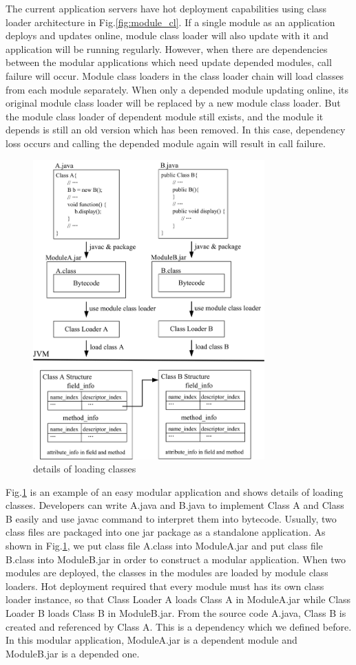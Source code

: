 \documentclass[conference]{IEEEtran}
\begin{document}
The current application servers have hot deployment capabilities using class loader architecture in Fig.\ref{fig:module_cl}.
If a single module as an application deploys and updates online, module class loader will also update with it and application will be running regularly.
However, when there are dependencies between the modular applications which need update depended modules, call failure will occur.
Module class loaders in the class loader chain will load classes from each module separately.
When only a depended module updating online, its original module class loader will be replaced by a new module class loader.
But the module class loader of dependent module still exists, and the module it depends is still an old version which has been removed.
In this case, dependency loss occurs and calling the depended module again will result in call failure.

\begin{figure}[!t]
\centering
\includegraphics[width=3.5in]{reason_example.jpg}
\caption{details of loading classes}
\label{fig:reason}
\end{figure}

Fig.\ref{fig:reason} is an example of an easy modular application and shows details of loading classes.
Developers can write A.java and B.java to implement Class A and Class B easily and use javac command to interpret them into bytecode.
Usually, two class files are packaged into one jar package as a standalone application.
As shown in Fig.\ref{fig:reason}, we put class file A.class into ModuleA.jar and put class file B.class into ModuleB.jar in order to construct a modular application.
When two modules are deployed, the classes in the modules are loaded by module class loaders.
Hot deployment required that every module must has its own class loader instance, so that Class Loader A loads Class A in ModuleA.jar while Class Loader B loads Class B in ModuleB.jar.
From the source code A.java, Class B is created and referenced by Class A.
This is a dependency which we defined before.
In this modular application, ModuleA.jar is a dependent module and ModuleB.jar is a depended one.
\end{document}
